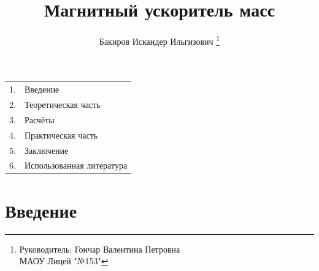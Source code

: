 \documentclass[14pt]{extarticle}
\title{Магнитный ускоритель масс}
\author{Бакиров Искандер Ильгизович \thanks{ Руководитель: Гончар Валентина Петровна \\ МАОУ Лицей "№153"}}
\begin{document}
\maketitle

\vspace{7cm}
\begin{center} 
\begin{tabular}{cl} 
1. & Введение \\  
2. & Теоретическая часть \\  
3. & Расчёты \\
4. & Практическая часть \\
5. & Заключение \\
6. & Использованная литература
\end{tabular} 
\end{center}





\newpage
\section{Введение}
\end{document}
